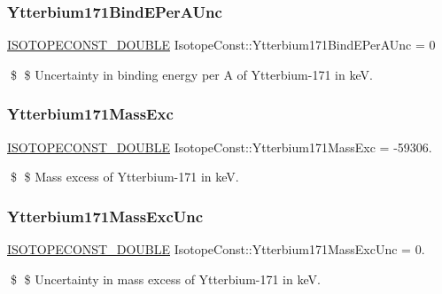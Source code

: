 \subsubsection{\texorpdfstring{Ytterbium171\+Bind\+E\+Per\+A\+Unc}{Ytterbium171BindEPerAUnc}}
{\footnotesize\ttfamily \mbox{\hyperlink{group___isotope_const-_macros_ga8f45a7272ce02c0b4c65c44636ed719a}{I\+S\+O\+T\+O\+P\+E\+C\+O\+N\+S\+T\+\_\+\+D\+O\+U\+B\+LE}} Isotope\+Const\+::\+Ytterbium171\+Bind\+E\+Per\+A\+Unc = 0}

\$ \$ Uncertainty in binding energy per A of Ytterbium-\/171 in keV. \mbox{\label{group___isotope_const-_ytterbium-_yb171_ga1f88d2d2466435426cffaf5a8bffd438}} 
\subsubsection{\texorpdfstring{Ytterbium171\+Mass\+Exc}{Ytterbium171MassExc}}
{\footnotesize\ttfamily \mbox{\hyperlink{group___isotope_const-_macros_ga8f45a7272ce02c0b4c65c44636ed719a}{I\+S\+O\+T\+O\+P\+E\+C\+O\+N\+S\+T\+\_\+\+D\+O\+U\+B\+LE}} Isotope\+Const\+::\+Ytterbium171\+Mass\+Exc = -\/59306.}

\$ \$ Mass excess of Ytterbium-\/171 in keV. \mbox{\label{group___isotope_const-_ytterbium-_yb171_ga8fc8405b87e1a05ed8ca275e348fbed5}} 
\subsubsection{\texorpdfstring{Ytterbium171\+Mass\+Exc\+Unc}{Ytterbium171MassExcUnc}}
{\footnotesize\ttfamily \mbox{\hyperlink{group___isotope_const-_macros_ga8f45a7272ce02c0b4c65c44636ed719a}{I\+S\+O\+T\+O\+P\+E\+C\+O\+N\+S\+T\+\_\+\+D\+O\+U\+B\+LE}} Isotope\+Const\+::\+Ytterbium171\+Mass\+Exc\+Unc = 0.}

\$ \$ Uncertainty in mass excess of Ytterbium-\/171 in keV. \mbox{\label{group___isotope_const-_ytterbium-_yb171_ga9327d61f017df0f4d748ed253d382bf4}} 
